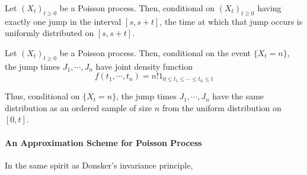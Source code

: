 \begin{theorem}
    Let $(X_t)_{t\geq 0}$ be a Poisson process. Then, conditional on $(X_t)_{t\geq 0}$ having exactly one jump in the interval $[s, s +t]$, the time at which that jump occurs is uniformly distributed on $[s, s + t]$.
\end{theorem}
\begin{theorem}
    Let $(X_t)_{t\geq 0}$ be a Poisson process. Then, conditional on the event $\{X_t = n\}$, the jump times $J_1, \cdots ,J_n$ have joint density function
\[f(t_1,\cdots ,t_n)=n!1_{0\leq t_1\leq \cdots \leq t_n\leq t}\]
\end{theorem}
\begin{remark}
    Thus, conditional on $\{X_t = n\}$, the jump times $J_1, \cdots ,J_n$ have the same distribution as an ordered sample of size $n$ from the uniform distribution on $[0,t]$.
\end{remark}

\paragraph{An Approximation Scheme for Poisson Process} In the same spirit as Donsker's invariance principle,

